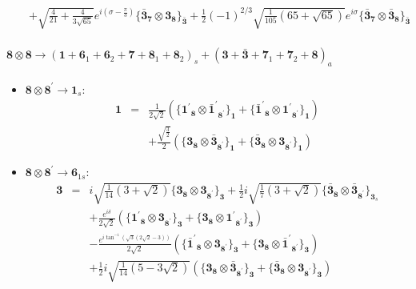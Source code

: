 \documentclass[english]{article}
\newcommand{\subcg}[3]{\big\{ {#1}\otimes{#2}\big\}^{}_{#3}}
\newcommand{\rep}[1]{\mathbf{#1}}
\begin{document}
\begin{itemize}
\begin{eqnarray*}
 & & +\sqrt{\frac{4}{21}+\frac{4}{3 \sqrt{65}}} e^{i \left(\sigma -\frac{\pi }{3}\right)}\subcg{\rep{\bar{3}}_{\rep{7}}}{\rep{3}_{\rep{8}}}{\rep{\bar{3}}}+\frac{1}{2} (-1)^{2/3} \sqrt{\frac{1}{105} \left(65+\sqrt{65}\right)} e^{i \sigma }\subcg{\rep{\bar{3}}_{\rep{7}}}{\rep{\bar{3}}_{\rep{8}}}{\rep{\bar{3}}}
\end{eqnarray*}
\end{itemize}
\paragraph*{\Large $\rep{8}\otimes\rep{8}\to\left(\rep{1}+\rep{6}_{1}+\rep{6}_{2}+\rep{7}+\rep{8}_{1}+\rep{8}_{2}\right)_s+\left(\rep{3}+\rep{\bar{3}}+\rep{7}_{1}+\rep{7}_{2}+\rep{8}\right)_a$}
\begin{itemize}
\item $\rep{8}\otimes\rep{8^{\prime}}\to\rep{1}_{s}$:
\begin{eqnarray*}
\rep{1} &=& \frac{1}{2 \sqrt{2}}\left(\subcg{\rep{1^{\prime}}_{\rep{8}}}{\rep{\bar{1}^{\prime}}_{\rep{8^{\prime}}}}{\rep{1}}+\subcg{\rep{\bar{1}^{\prime}}_{\rep{8}}}{\rep{1^{\prime}}_{\rep{8^{\prime}}}}{\rep{1}}\right) \\ 
 & & +\frac{\sqrt{\frac{3}{2}}}{2}\left(\subcg{\rep{3}_{\rep{8}}}{\rep{\bar{3}}_{\rep{8^{\prime}}}}{\rep{1}}+\subcg{\rep{\bar{3}}_{\rep{8}}}{\rep{3}_{\rep{8^{\prime}}}}{\rep{1}}\right)
\end{eqnarray*}
\item $\rep{8}\otimes\rep{8^{\prime}}\to\rep{6}_{1s}$:
\begin{eqnarray*}
\rep{3} &=& i \sqrt{\frac{1}{14} \left(3+\sqrt{2}\right)}\subcg{\rep{3}_{\rep{8}}}{\rep{3}_{\rep{8^{\prime}}}}{\rep{3}}+\frac{1}{2} i \sqrt{\frac{1}{7} \left(3+\sqrt{2}\right)}\subcg{\rep{\bar{3}}_{\rep{8}}}{\rep{\bar{3}}_{\rep{8^{\prime}}}}{\rep{3}_{s}} \\ 
 & & +\frac{e^{i \delta }}{2 \sqrt{2}}\left(\subcg{\rep{1^{\prime}}_{\rep{8}}}{\rep{3}_{\rep{8^{\prime}}}}{\rep{3}}+\subcg{\rep{3}_{\rep{8}}}{\rep{1^{\prime}}_{\rep{8^{\prime}}}}{\rep{3}}\right) \\ 
 & & -\frac{e^{i \tan ^{-1}\left(\sqrt{3} \left(2 \sqrt{2}-3\right)\right)}}{2 \sqrt{2}}\left(\subcg{\rep{\bar{1}^{\prime}}_{\rep{8}}}{\rep{3}_{\rep{8^{\prime}}}}{\rep{3}}+\subcg{\rep{3}_{\rep{8}}}{\rep{\bar{1}^{\prime}}_{\rep{8^{\prime}}}}{\rep{3}}\right) \\ 
 & & +\frac{1}{2} i \sqrt{\frac{1}{14} \left(5-3 \sqrt{2}\right)}\left(\subcg{\rep{3}_{\rep{8}}}{\rep{\bar{3}}_{\rep{8^{\prime}}}}{\rep{3}}+\subcg{\rep{\bar{3}}_{\rep{8}}}{\rep{3}_{\rep{8^{\prime}}}}{\rep{3}}\right)

\end{eqnarray*}
\end{itemize}
\end{document}
